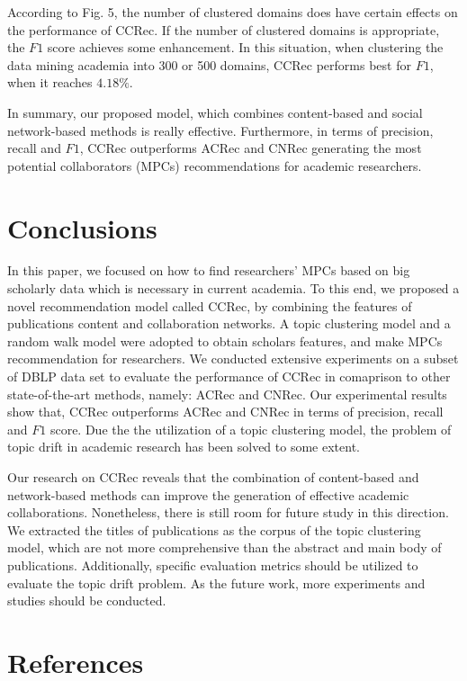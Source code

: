 \documentclass[review]{elsarticle}
\begin{document}
According to Fig. 5, the number of clustered domains does have certain effects on the performance of CCRec. If the number of clustered domains is appropriate, the $F1$ score achieves some enhancement. In this situation, when clustering the data mining academia into 300 or 500 domains, CCRec performs best for $F1$, when it reaches $4.18\%$.

In summary, our proposed model, which combines content-based and social network-based methods is really effective. Furthermore, in terms of precision, recall and $F1$, CCRec outperforms ACRec and CNRec generating the most potential collaborators (MPCs) recommendations for academic researchers.
\section{Conclusions}
In this paper, we focused on how to find researchers' MPCs based on big scholarly data which is necessary in current academia. To this end, we proposed a novel recommendation model called CCRec, by combining the features of publications content and collaboration networks. A topic clustering model and a random walk model were adopted to obtain scholars features, and make MPCs recommendation for researchers. We conducted extensive experiments on a subset of DBLP data set to evaluate the performance of CCRec in comaprison to other state-of-the-art methods, namely: ACRec and CNRec. Our experimental results show that, CCRec outperforms ACRec and CNRec in terms of precision, recall and $F1$ score. Due the the utilization of a topic clustering model, the problem of topic drift in academic research has been solved to some extent.

Our research on CCRec reveals that the combination of content-based and network-based methods can improve the generation of effective academic collaborations. Nonetheless, there is still room for future study in this direction. We extracted the titles of publications as the corpus of the topic clustering model, which are not more comprehensive than the abstract and main body of publications. Additionally, specific evaluation metrics should be utilized to evaluate the topic drift problem. As the future work, more experiments and studies should be conducted.

\section*{References}


\end{document}
